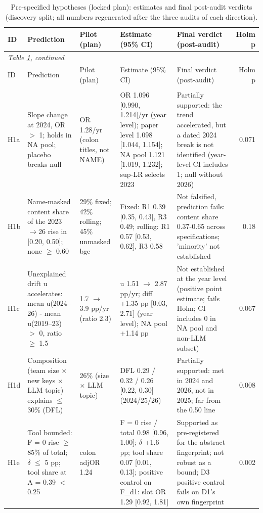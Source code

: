 {\scriptsize
\begin{longtable}{l p{2.5cm} p{2.2cm} p{3.9cm} p{3.2cm} r}
\caption{Pre-specified hypotheses (locked plan): estimates and final post-audit verdicts (discovery split; all numbers regenerated after the three audits of each direction).}\label{tab:hypotheses}\\
\toprule
ID & Prediction & Pilot (plan) & Estimate (95\% CI) & Final verdict (post-audit) & Holm p \\
\midrule
\endfirsthead
\multicolumn{6}{l}{\textit{Table \ref{tab:hypotheses}, continued}}\\
\toprule
ID & Prediction & Pilot (plan) & Estimate (95\% CI) & Final verdict (post-audit) & Holm p \\
\midrule
\endhead
\bottomrule
\endfoot
\multicolumn{6}{l}{\textit{D1 The naming acceleration: content, composition or tool}} \\
H1a & Slope change at 2024, OR $>$ 1; holds in NA pool; placebo breaks null & OR 1.28/yr (colon titles, not NAME) & OR 1.096 [0.990, 1.214]/yr (year level); paper level 1.098 [1.044, 1.154]; NA pool 1.121 [1.019, 1.232]; sup-LR selects 2023 & Partially supported: the trend accelerated, but a dated 2024 break is not identified (year-level CI includes 1; null without 2026) & 0.071 \\
H1b & Name-masked content share of the 2023$\rightarrow$26 rise in [0.20, 0.50]; none $\geq$ 0.60 & 29\% fixed; 42\% rolling; 45\% unmasked bge & Fixed: R1 0.39 [0.35, 0.43], R3 0.49; rolling: R1 0.57 [0.53, 0.62], R3 0.58 & Not falsified, prediction fails: content share 0.37-0.65 across specifications; 'minority' not established & 0.18 \\
H1c & Unexplained drift u accelerates: mean u(2024--26) - mean u(2019--23) $>$ 0, ratio $\geq$ 1.5 & 1.7 $\rightarrow$ 3.9 pp/yr (ratio 2.3) & u 1.51 $\rightarrow$ 2.87 pp/yr; diff +1.35 pp [0.03, 2.71] (year level); NA pool +1.14 pp & Not established at the year level (positive point estimate; fails Holm; CI includes 0 in NA pool and non-LLM subset) & 0.067 \\
H1d & Composition (team size $\times$ new keys $\times$ LLM topic) explains $\leq$ 30\% (DFL) & 26\% (size $\times$ LLM topic) & DFL 0.29 / 0.32 / 0.26 [0.22, 0.30] (2024/25/26) & Partially supported: met in 2024 and 2026, not in 2025; far from the 0.50 line & 0.008 \\
H1e & Tool bounded: F = 0 rise $\geq$ 85\% of total; $\delta$ $\leq$ 5 pp; tool share at A = 0.39 $<$ 0.25 & colon adjOR 1.24 & F = 0 rise / total 0.98 [0.96, 1.00]; $\delta$ +1.6 pp; tool share 0.07 [0.01, 0.13]; positive control on F\_d1: slot OR 1.29 [0.92, 1.81] & Supported as pre-registered for the abstract fingerprint; not robust as a bound; D3 positive control fails on D1's own fingerprint & 0.002 \\

\end{longtable}}
